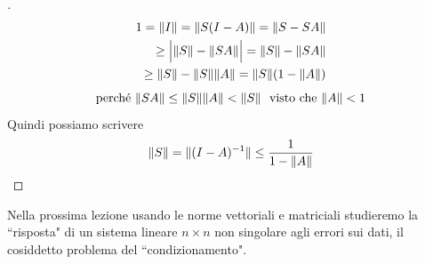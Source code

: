 \begin{proof}[\unskip\nopunct]
\begin{equation*}
\begin{split}
1 =  \lVert I\rVert = \lVert S(I-A)\rVert = \lVert S-SA\rVert \\ 
    \geq \Big | \lVert S\rVert - \lVert SA\rVert \Big | = \lVert S\rVert - \lVert SA\rVert \\
    \geq \lVert S\rVert - \lVert S\rVert \lVert A\rVert = \lVert S\rVert (1-\lVert A\rVert)
\end{split}
\end{equation*}
\begin{equation*}
    \text{perché} \  \lVert SA\rVert \leq \lVert S\rVert \lVert A\rVert < \lVert S\rVert\ \text{ visto che} \  \lVert A\rVert < 1\\
\end{equation*}
Quindi possiamo scrivere
\begin{equation*}
    \lVert S\rVert = \lVert(I-A)^{-1}\rVert \leq \frac{1}{1-\lVert A\rVert}
\end{equation*}
\end{proof}

Nella prossima lezione usando le norme vettoriali e matriciali studieremo la ``risposta" di un sistema lineare $n \times n$ non singolare agli errori sui dati, il cosiddetto problema del ``condizionamento".\\
\newpage